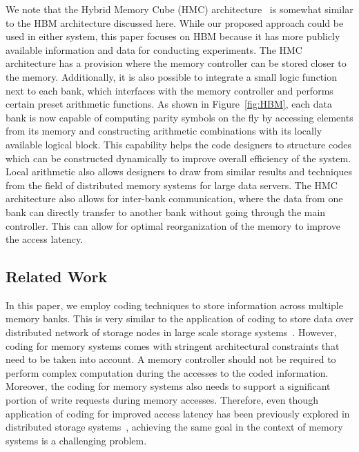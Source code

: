 \begin{remark}
We note that the Hybrid Memory Cube (HMC) architecture~\cite{HMC_slides} is somewhat similar to the HBM architecture discussed here. While our proposed approach could be used in either system, this paper focuses on HBM because it has more publicly available information and data for conducting experiments. The HMC architecture has a provision where the memory controller can be stored closer to the memory. Additionally, it is also possible to integrate a small logic function next to each bank, which interfaces with the memory controller and performs certain preset arithmetic functions. As shown in Figure~\ref{fig:HBM}, each data bank is now capable of computing parity symbols on the fly by accessing elements from its memory and constructing arithmetic combinations with its locally available logical block. This capability helps the code designers to structure codes which can be constructed dynamically to improve overall efficiency of the system. Local arithmetic also allows designers to draw from similar results and techniques from the field of distributed memory systems for large data servers. The HMC architecture also allows for inter-bank communication, where the data from one bank can directly transfer to another bank without going through the main controller. This can allow for optimal reorganization of the memory to improve the access latency. 
\end{remark}

\newpage

%
\subsection{Related Work}
\label{sec:related}

In this paper, we employ coding techniques to store information across multiple memory banks. This is very similar to the application of coding to store data over distributed network of storage nodes in large scale storage systems~\cite{khan, dimakis, Azure12, sathiamoorthy, Hitchhiker}. However, coding for memory systems comes with stringent architectural constraints that need to be taken into account. A memory controller should not be required to perform complex computation during the accesses to the coded information. Moreover, the coding for memory systems also needs to support a significant portion of write requests during memory accesses. Therefore, even though application of coding for improved access latency has been previously explored in distributed storage systems~\cite{batchcodes, RPDV16, RSDG16, WKCB17}, achieving the same goal in the context of memory systems is a challenging problem. 


